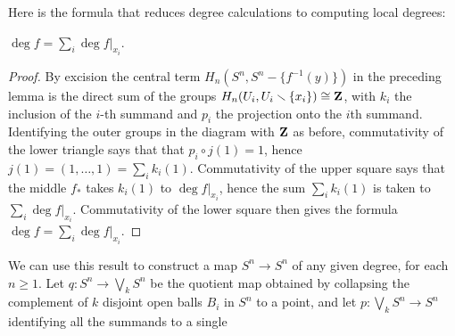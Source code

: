 Here is the formula that reduces degree calculations to computing local
degrees:
\begin{proposition}[2.30]
$\deg f=\sum_i\deg f|_{x_i}$.
\end{proposition}
\begin{proof}
By excision the central term $H_n(S^n,S^n\minus\{f^{-1}(y)\})$ in the
preceding lemma is the direct sum of the groups
$H_n(U_i,U_i\smallsetminus\{x_i\})\cong\mathbf{Z}$, with $k_i$ the inclusion of the
$i$-th  summand and $p_i$ the projection onto the $i$th
summand. Identifying the outer groups in the diagram with $\mathbf{Z}$ as before,
commutativity of the lower triangle says that that $p_i\circ j(1)=1$, hence
$j(1)=(1,\dotsc,1)=\sum_ik_i(1)$. Commutativity of the upper square says
that the middle $f_*$ takes $k_i(1)$ to $\deg f|_{x_i}$, hence the sum
$\sum_ik_i(1)$ is taken to $\sum_i\deg f|_{x_i}$. Commutativity of the
lower square then gives the formula $\deg f=\sum_i\deg f|_{x_i}$.
\end{proof}
\begin{example}[2.31]
We can use this result to construct a map $S^n\to S^n$ of any given degree,
for each $n\geq 1$. Let $q\colon S^n\to \bigvee_k S^n$ be the quotient map
obtained by collapsing the complement of $k$ disjoint open balls $B_i$ in
$S^n$ to a point, and let $p\colon\bigvee_k S^n\to S^n$ identifying all the
summands to a single
\end{example}

